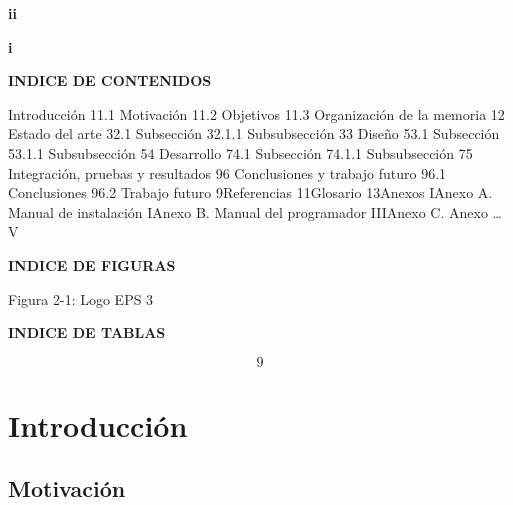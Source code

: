 \documentclass{article} %
\begin{document}
\noindent \textit{}

\noindent \textit{}

\noindent \textbf{\textit{\eject }}

\textbf{ }

\noindent \textbf{}

\noindent \textbf{}

\noindent \textbf{}

\noindent 

\noindent 
{\bf ii}

\noindent 

\noindent 
{\bf i}

\noindent \textbf{}

\noindent \textbf{}

\noindent \textbf{INDICE DE CONTENIDOS}

 Introducci\'{o}n 11.1 Motivaci\'{o}n 11.2 Objetivos 11.3 Organizaci\'{o}n de la memoria 12 Estado del arte 32.1 Subsecci\'{o}n 32.1.1 Subsubsecci\'{o}n 33 Dise\~{n}o 53.1 Subsecci\'{o}n 53.1.1 Subsubsecci\'{o}n 54 Desarrollo 74.1 Subsecci\'{o}n 74.1.1 Subsubsecci\'{o}n 75 Integraci\'{o}n, pruebas y resultados 96 Conclusiones y trabajo futuro 96.1 Conclusiones 96.2 Trabajo futuro 9Referencias 11Glosario 13Anexos IAnexo A. Manual de instalaci\'{o}n IAnexo B. Manual del programador IIIAnexo C. Anexo {\dots} V\textbf{}

\noindent \textbf{}

\noindent \textbf{}

\noindent \textbf{}

\noindent \textbf{}

\noindent \textbf{INDICE DE FIGURAS}

\noindent \textbf{}

\noindent Figura 2-1: Logo EPS 3\textbf{}

\noindent \textbf{INDICE DE TABLAS}

\noindent \textbf{}

\noindent \textbf{}
\[9\] 

{\bf }


\section{ Introducci\'{o}n}


\subsection{ Motivaci\'{o}n}
\end{document}
